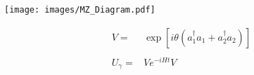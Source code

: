 \noident
\hspace{-0.1\linewidth}
\begin{minipage}{0.48\linewidth}
  \centering
\texttt{[image: images/MZ\_Diagram.pdf]}
\end{minipage}
\begin{minipage}{0.5\textwidth}
  \Large{
    \begin{align*}
      V =& \exp\left[ i\theta \left( a_{1}^{\dagger}a_{1} +a_{2}^{\dagger}a_{2}\right) \right]\\
      \\
      U_{\gamma} =& V e^{-iHt}V
    \end{align*}
  }
\end{minipage}
